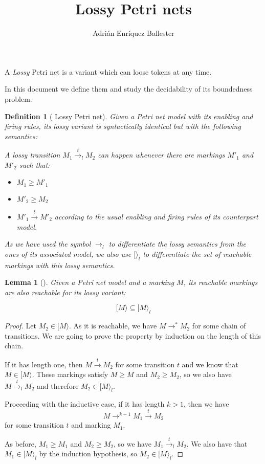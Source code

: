 \documentclass{article}
\title{Lossy Petri nets}
\author{Adrián Enríquez Ballester}
\newtheorem{definition}{Definition}
\newtheorem{lemma}{Lemma}
\begin{document}
\maketitle

A \textit{Lossy} Petri net is a variant which can loose tokens 
at any time.

In this document we define them and study the decidability of 
its boundedness problem.

\begin{definition}[
  Lossy Petri net
]\label{def:lossy-net}
  Given a Petri net model with its enabling and firing rules, 
  its lossy variant is syntactically identical but with 
  the following semantics:

  A lossy transition $M_1 \stackrel{t}{\rightarrow}_l M_2$
  can happen whenever there are markings $M'_1$ and $M'_2$ such 
  that:

  \begin{itemize}
    \item $M_1 \geq M'_1$
    \item $M'_2 \geq M_2$
    \item $M'_1 \stackrel{t}{\rightarrow} M'_2$ according to the 
      usual enabling and firing rules of its counterpart model.
  \end{itemize}

  As we have used the symbol $\rightarrow_l$ to differentiate the 
  lossy semantics from the ones of its associated model, we also 
  use $[\rangle_l$ to differentiate the set of reachable markings 
  with this lossy semantics.
\end{definition}

\begin{lemma}[]\label{lem:regular-lossy}
  Given a Petri net model and a marking $M$, its reachable markings 
  are also reachable for its lossy variant: 

  $$[M\rangle \subseteq [M\rangle_l$$
\end{lemma}
\begin{proof}
  Let $M_2 \in [M\rangle$. As it is reachable, we have 
  $M \rightarrow^* M_2$ for some chain of 
  transitions. We are going to prove the property by induction
  on the length of this chain.

  If it has length one, then $M \stackrel{t}{\rightarrow} M_2$ for 
  some transition $t$ and we know that $M \in [M\rangle$. 
  These markings satisfy 
  $M \geq M$ and $M_2 \geq M_2$, so we also have 
  $M \stackrel{t}{\rightarrow}_l M_2$ and therefore $M_2 \in [M\rangle_l$.
  
  Proceeding with the inductive case, if it has length $k > 1$, 
  then we have 
  $$M \rightarrow^{k - 1} M_1 \stackrel{t}{\rightarrow} M_2$$
  for some transition $t$ and marking $M_1$. 
  
  As before, $M_1 \geq M_1$ and 
  $M_2 \geq M_2$, so we have
  $M_1 \stackrel{t}{\rightarrow}_l M_2$. We also have that 
  $M_1 \in [M\rangle_l$ by the induction hypothesis, so 
  $M_2 \in [M\rangle_l$.
\end{proof}
\end{document}
